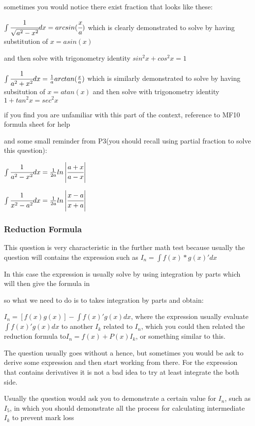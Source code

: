 \documentclass[]{article}
\begin{document}
sometimes you would notice there exist fraction that looks like these:

\(\int \cfrac{1}{\sqrt{a^2 - x^2}}dx = arcsin(\cfrac{x}{a})\) which is
clearly demonstrated to solve by having substitution of \(x = a sin(x)\)

and then solve with trigonometry identity \(sin^2{x} + cos^2{x}=1\)

\(\int{\cfrac{1}{a^2 + x^2}}dx = \frac{1}{a}arctan(\frac{x}{a})\) which
is similarly demonstrated to solve by having subsitution of
\(x = a tan(x)\) and then solve with trigonometry identity
\(1+tan^2{x} = sec^2{x}\)

if you find you are unfamiliar with this part of the context, reference
to MF10 formula sheet for help

and some small reminder from P3(you should recall using partial fraction
to solve this question):

\(\int{\cfrac{1}{a^2 - x^2}}dx = \frac{1}{2a} ln \left|{\cfrac{a+x}{a-x}}\right|\)

\(\int{\cfrac{1}{x^2-a^2}}dx = \frac{1}{2a} ln \left|\cfrac{x-a}{x+a}\right|\)

\subsubsection{Reduction Formula}\label{header-n128}

This question is very characteristic in the further math test because
usually the question will contains the expression such as
\(I_n= \int f(x) * g(x)'dx\)

In this case the expression is usually solve by using integration by
parts which will then give the formula in

so what we need to do is to takes integration by parts and obtain:

\(I_n = [f(x)g(x)] - \int{f(x)'g(x)}dx\), where the expression usually
evaluate \(\int f(x)'g(x) dx\) to another \(I_k\) related to \(I_n\),
which you could then related the reduction formula
to\(I_n = f(x) + P(x)I_k\), or something similar to this.

The question usually goes without a hence, but sometimes you would be
ask to derive some expression and then start working from there. For the
expression that contains derivatives it is not a bad idea to try at
least integrate the both side.

Usually the question would ask you to demonstrate a certain value for
\(I_n\), such as \(I_5\), in which you should demonstrate all the
process for calculating intermediate \(I_k\) to prevent mark loss
\end{document}
